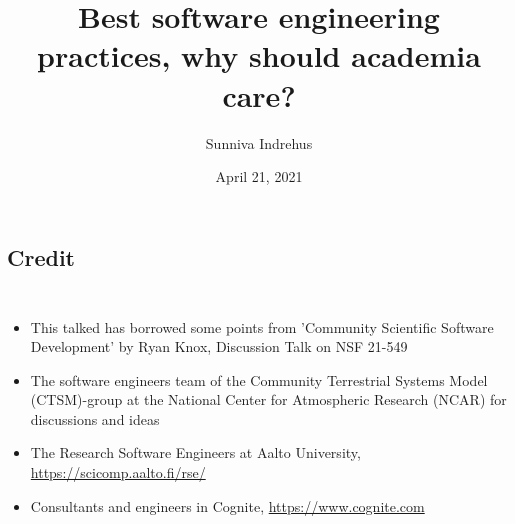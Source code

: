 \documentclass[usenames,dvipsnames]{beamer}
\theoremstyle{plain}
\theoremstyle{definition}
\begin{document}
\title{Best software engineering practices, why should academia care?}
 \institute{
A Lavterskel talk \\
\\
 Meteorology and Oceanography
 }

 \author{Sunniva Indrehus }


 \date{\scriptsize April 21, 2021}

 \vspace{-2.cm}
 \frame{
   \titlepage
   \thispagestyle{empty}
 }


\section{}
\subsection{Credit}


\begin{frame}{\setframetitle{}}
  {
    \begin{columns}
      \begin{itemize}
        \item This talked has borrowed some points from 'Community Scientific
          Software Development' by Ryan Knox, Discussion Talk on NSF 21-549
        \item The software engineers team of the Community Terrestrial Systems Model
          (CTSM)-group at the National Center for Atmospheric Research (NCAR)
          for discussions and ideas
          \item The Research Software Engineers at Aalto University,
            \url{https://scicomp.aalto.fi/rse/}
          \item Consultants and engineers in Cognite, \url{https://www.cognite.com}
        \end{itemize}

    \end{columns}
  }
\end{frame}
\end{document}
